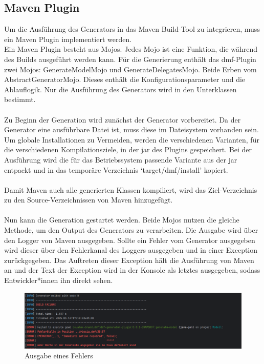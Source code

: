 \documentclass[./einleitung.tex]{subfiles}
\begin{document}
    \subsection{Maven Plugin}
    Um die Ausführung des Generators in das Maven Build-Tool zu integrieren, muss ein Maven Plugin implementiert werden.\\
    Ein Maven Plugin besteht aus Mojos.
    Jedes Mojo ist eine Funktion, die während des Builds ausgeführt werden kann.
    Für die Generierung enthält das \acrshort{dmf}-Plugin zwei Mojos: GenerateModelMojo und GenerateDelegatesMojo.
    Beide Erben vom AbstractGeneratorMojo.
    Dieses enthält die Konfigurationsparameter und die Ablauflogik.
    Nur die Ausführung des Generators wird in den Unterklassen bestimmt.
    \\\\
    Zu Beginn der Generation wird zunächst der Generator vorbereitet.
    Da der Generator eine ausführbare Datei ist, muss diese im Dateisystem vorhanden sein.
    Um globale Installationen zu Vermeiden, werden die verschiedenen Varianten, für die verschiedenen Kompilationsziele, in der \acrshort{jar} des Plugins gespeichert.
    Bei der Ausführung wird die für das Betriebssystem passende Variante aus der \acrshort{jar} entpackt und in das temporäre Verzeichnis `target/dmf/install' kopiert.
    \\\\
    Damit Maven auch alle generierten Klassen kompiliert, wird das Ziel-Verzeichnis zu den Source-Verzeichnissen von Maven hinzugefügt.
    \\\\
    Nun kann die Generation gestartet werden.
    Beide Mojos nutzen die gleiche Methode, um den Output des Generators zu verarbeiten.
    Die Ausgabe wird über den Logger von Maven ausgegeben.
    Sollte ein Fehler vom Generator ausgegeben wird dieser über den Fehlerkanal des Loggers ausgegeben und in einer Exception zurückgegeben.
    Das Auftreten dieser Exception hält die Ausführung von Maven an und der Text der Exception wird in der Konsole als letztes ausgegeben, sodass Entwickler*innen ihn direkt sehen.
    \begin{figure}[tH]
        \centering
        \includegraphics[width=\linewidth]{bilder/screenshot-error-generator}
        \caption{Ausgabe eines Fehlers}
        \label{fig:screenshot-error-generator}
    \end{figure}
\end{document}
